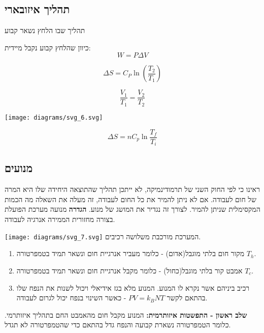 \documentclass{tstextbook}
\begin{document}
\subsection{תהליך איזובארי}

\begin{definition}
תהליך שבו הלחץ נשאר קבוע

\end{definition}
\begin{proposition}
כיוון שהלחץ קבוע נקבל מיידית:
$$W=P\Delta V$$

\end{proposition}
\begin{proposition}
$$\Delta S =C_{P}\ln \left( \frac{T_{2}}{T_{1}} \right)$$

\end{proposition}
\begin{proposition}
$$\frac{V_{1}}{T_{1}}=\frac{V_{2}}{T_{2}}$$

\end{proposition}
\texttt{[image: diagrams/svg\_6.svg]}
\begin{proposition}
$$\Delta S=n C_{p}\ln{\frac{T_{f}}{T_{i}}}$$

\end{proposition}
\subsection{מנועים}

ראינו כי לפי החוק השני של תרמודינמיקה, לא ייתכן תהליך שהתוצאה היחידה שלו היא המרה של חום לעבודה. אם לא ניתן להמיר את כל החום לעבודה, זה מעלה את השאלה מה הכמות המקסימלית שניתן להמיר. לצורך זה נגדיר את המושג של מנוע.
\textbf{הגדרה} מנועה
מערכת הפועלת בצורה מחזורית הממירה אנרגיה לעבודה.

\texttt{[image: diagrams/svg\_7.svg]}
המערכת מורכבת משלושה רכיבים.

\begin{enumerate}
  \item מקור חום בלתי מוגבל(אדום) - כלומר מעביר אנרגיית חום ונשאר תמיד בטמפרטורה \(T_{h}\). 


  \item אמבט קור בלתי מוגבל(כחול) - כלומר מקבל אנרגיית חום ונשאר תמיד בטמפרטורה \(T_{c}\). 


  \item רכיב ביניהם אשר נקרא לו המנוע. המנוע מלא בגז אידיאלי ויכול לשנות את הנפח שלו בהתאם לקשר \(PV=k_{B}NT\) - כאשר השינוי בנפח יכול לגרום לעבודה. 


\end{enumerate}
\textbf{שלב ראשון - התפשטות איזותרמית:} 
המנוע מקבל חום מהאמבט החם בתהליך איזותרמי. כלומר הטמפרטורה נשארת קבועה והנפח גדל בהתאם כדי שהטמפרטורה לא תגדל.
\end{document}
